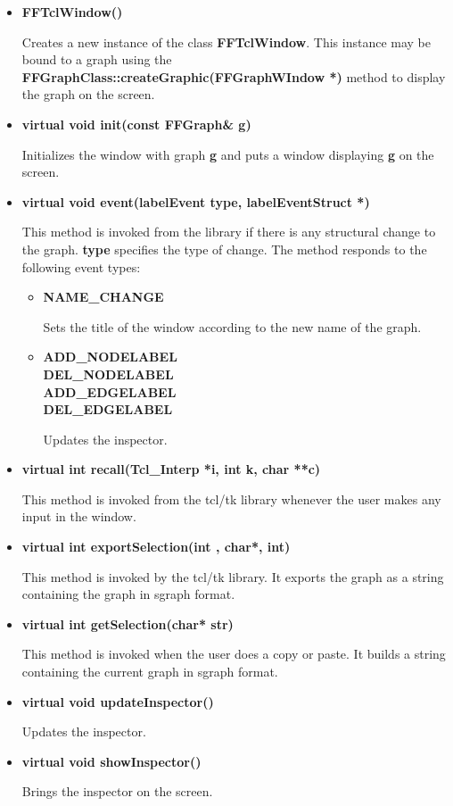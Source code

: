 \begin{itemize}

\item{\bf FFTclWindow()}

Creates a new instance of the class {\bf FFTclWindow}. This instance
may be bound to a graph using the {\bf
FFGraphClass::createGraphic(FFGraphWIndow *)} method to display the
graph on the screen.

\item{\bf virtual void init(const FFGraph\& g)}

Initializes the window with graph {\bf g} and puts a window 
displaying {\bf g} on the screen.

\item{\bf virtual void event(labelEvent type, labelEventStruct *)}

This method is invoked from the library if there is any structural
change to the graph. {\bf type} specifies the type of change. The
method responds to the following event types:

\begin{itemize}

\item{\bf NAME\_CHANGE}

Sets the title of the window according to the new name of the graph.

\item{\bf ADD\_NODELABEL\\
        DEL\_NODELABEL\\
        ADD\_EDGELABEL\\
        DEL\_EDGELABEL} 

Updates the inspector.

\end{itemize}

\item{\bf virtual int recall(Tcl\_Interp *i, int k, char **c)}

This method is invoked from the tcl/tk library whenever the user makes
any input in the window.

\item{\bf virtual int exportSelection(int , char*, int)}

This method is invoked by the tcl/tk library. It exports the graph as
a string containing the graph in sgraph format.

\item{\bf virtual int getSelection(char* str)}

This method is invoked when the user does a copy or paste. It builds a
string containing the current graph in sgraph format.


\item{\bf virtual void updateInspector()}

Updates the inspector.

\item{\bf virtual void showInspector()}

Brings the inspector on the screen.
  
\end{itemize}

